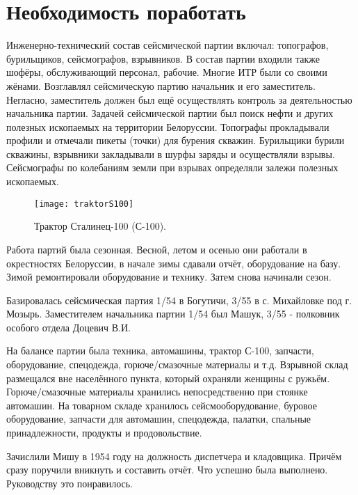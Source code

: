 ﻿\chapter{Необходимость поработать}

Инженерно-технический состав сейсмической партии включал: топографов, бурильщиков, сейсмографов, взрывников. В состав партии входили также шофёры, обслуживающий персонал, рабочие. Многие ИТР были со своими жёнами. Возглавлял сейсмическую партию начальник и его заместитель. Негласно, заместитель должен был ещё осуществлять контроль за деятельностью начальника партии. Задачей сейсмической партии был поиск нефти и других полезных ископаемых на территории Белоруссии. Топографы прокладывали профили и отмечали пикеты (точки) для бурения скважин. Бурильщики бурили скважины, взрывники закладывали в шурфы заряды и осуществляли взрывы. Сейсмографы по колебаниям земли при взрывах определяли залежи полезных ископаемых.

\begin{wrapfigure}{O}{.4\textwidth}
\centering
\texttt{[image: traktorS100]}
\caption[Трактор Сталинец-100 (С-100).]{Трактор Сталинец-100 (С-100)\footnotemark.}
\label{fig:traktorS100}
\end{wrapfigure}

Работа партий была сезонная. Весной, летом и осенью они работали в окрестностях Белоруссии, в начале зимы сдавали отчёт, оборудование на базу. Зимой ремонтировали оборудование и технику. Затем снова начинали сезон.

Базировалась сейсмическая партия 1/54 в Богутичи, 3/55 в с. Михайловке под г. Мозырь. Заместителем начальника партии 1/54 был Машук, 3/55 - полковник особого отдела Доцевич В.И.

На балансе партии была техника, автомашины, трактор С-100, запчасти, оборудование, спецодежда, горюче\-/смазочные материалы и т.д. Взрывной склад размещался вне населённого пункта, который охраняли женщины с ружьём. Горюче\-/смазочные материалы хранились непосредственно при стоянке автомашин. На товарном складе хранилось сейсмооборудование, буровое оборудование, запчасти для автомашин, спецодежда, палатки, спальные принадлежности, продукты и продовольствие.

Зачислили Мишу в 1954 году на должность диспетчера и кладовщика. Причём сразу поручили вникнуть и составить отчёт. Что успешно была выполнено. Руководству это понравилось.


